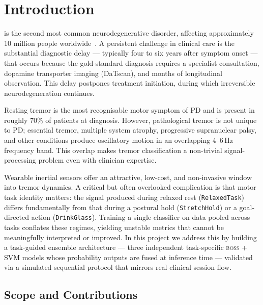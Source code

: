 \documentclass[12pt, a4paper]{article}
\newcommand{\boss}{\textsc{boss}}
\newcommand{\PD}{PD}
\begin{document}
\tableofcontents
\newpage

\section{Introduction}
\label{sec:intro}

\Pd{} is the second most common neurodegenerative disorder,
affecting approximately 10 million people worldwide~\cite{pads}.
A persistent challenge in clinical care is the substantial diagnostic
delay — typically four to six years after symptom onset — that occurs
because the gold-standard diagnosis requires a specialist consultation,
dopamine transporter imaging (DaTscan), and months of longitudinal
observation. This delay postpones treatment initiation, during which
irreversible neurodegeneration continues.

Resting tremor is the most recognisable motor symptom of \PD{} and
is present in roughly 70\% of patients at diagnosis. However,
pathological tremor is not unique to \PD{}; essential tremor, multiple
system atrophy, progressive supranuclear palsy, and other conditions
produce oscillatory motion in an overlapping 4--6\,Hz frequency band.
This overlap makes tremor classification a non-trivial signal-processing
problem even with clinician expertise.

Wearable inertial sensors offer an attractive, low-cost, and
non-invasive window into tremor dynamics. A critical but often
overlooked complication is that motor task identity matters: the
signal produced during relaxed rest (\texttt{RelaxedTask}) differs
fundamentally from that during a postural hold (\texttt{StretchHold})
or a goal-directed action (\texttt{DrinkGlass}). Training a single
classifier on data pooled across tasks conflates these regimes, yielding
unstable metrics that cannot be meaningfully interpreted or improved.
In this project we address this by building a task-guided ensemble
architecture — three independent task-specific \boss{} + SVM models
whose probability outputs are fused at inference time — validated via
a simulated sequential protocol that mirrors real clinical session flow.

\subsection*{Scope and Contributions}
\end{document}
